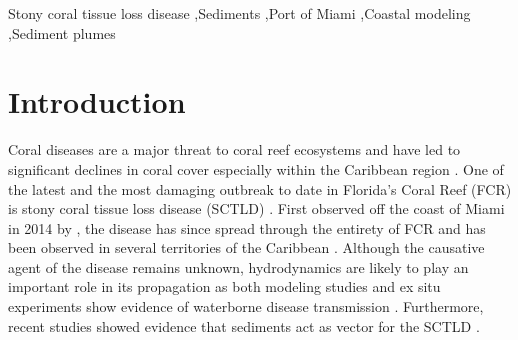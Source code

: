 \documentclass[preprint,12pt,authoryear]{elsarticle}
\begin{document}
\begin{frontmatter}


    \begin{keyword}
        Stony coral tissue loss disease \sep Sediments \sep Port of Miami \sep Coastal modeling \sep Sediment plumes 



    \end{keyword}

\end{frontmatter}

\linenumbers

\section{Introduction}

Coral diseases are a major threat to coral reef ecosystems and have led to significant declines in coral cover especially within the Caribbean region \citep{richardson1998coral, sutherland2004disease, aronson2001white, harvell2007coral, brandt2009dynamics}. One of the latest and the most damaging outbreak to date in Florida's Coral Reef (FCR) is stony coral tissue loss disease (SCTLD) \citep{noaa2018}. First observed off the coast of Miami in 2014 by \cite{precht2016unprecedented}, the disease has since spread through the entirety of FCR \citep{muller2020spatial,dobbelaere2022} and has been observed in several territories of the Caribbean \citep{kramer2019map, meiling2021variable, estrada2021effects,heres2021ecological}. Although the causative agent of the disease remains unknown, hydrodynamics are likely to play an important role in its propagation as both modeling studies and ex situ experiments show evidence of waterborne disease transmission \citep{aeby2019pathogenesis,dobbelaere2020coupled,eaton2021measuring, meiling2021variable}. Furthermore, recent studies showed evidence that sediments act as vector for the SCTLD \citep{rosales2020rhodobacterales, studivan2022reef}.
\end{document}
